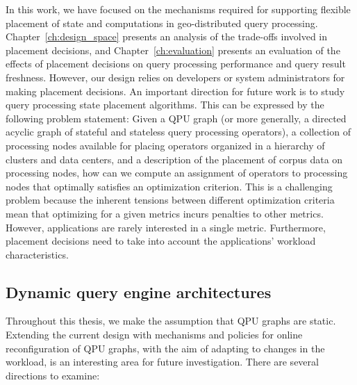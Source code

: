 In this work, we have focused on the mechanisms required for supporting flexible placement of state
and computations in geo-distributed query processing.
Chapter~\ref{ch:design_space} presents an analysis of the trade-offs involved in placement decisions,
and Chapter~\ref{ch:evaluation} presents an evaluation of the effects of placement decisions on query processing performance
and query result freshness.
However, our design relies on developers or system administrators for making placement decisions.
An important direction for future work is to study query processing state placement algorithms.
This can be expressed by the following problem statement:
Given a QPU graph (or more generally, a directed acyclic graph of stateful and stateless query processing operators),
a collection of processing nodes available for placing operators organized in a hierarchy of clusters and data centers,
and a description of the placement of corpus data on processing nodes,
how can we compute an assignment of operators to processing nodes that optimally satisfies an optimization criterion.
This is a challenging problem because the inherent tensions between different optimization criteria mean that
optimizing for a given metrics incurs penalties to other metrics.
However, applications are rarely interested in a single metric.
Furthermore, placement decisions need to take into account the applications' workload characteristics.

\subsection{Dynamic query engine architectures}
\label{sec:future_dynamic}
Throughout this thesis, we make the assumption that QPU graphs are static.
Extending the current design with mechanisms and policies for online reconfiguration of QPU graphs,
with the aim of adapting to changes in the workload, is an interesting area for future investigation.
There are several directions to examine:

